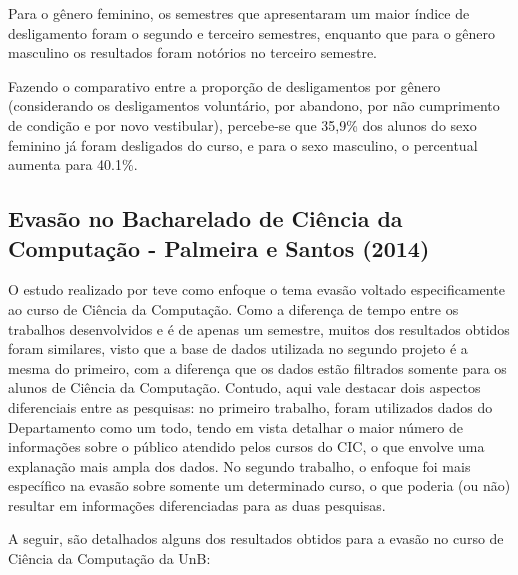 Para o gênero feminino, os semestres que apresentaram um maior índice de desligamento foram o segundo e terceiro semestres, enquanto que para o gênero masculino os resultados foram notórios no terceiro semestre.

Fazendo o comparativo entre a proporção de desligamentos por gênero (considerando os desligamentos voluntário, por abandono, por não cumprimento de condição e por novo vestibular), percebe-se que 35,9\% dos alunos do sexo feminino já foram desligados do curso, e para o sexo masculino, o percentual aumenta para 40.1\%.

\subsection{Evasão no Bacharelado de Ciência da Computação - Palmeira e Santos (2014)} \label{2title54}

O estudo realizado por \citet{palmeira_santos2014} teve como enfoque o tema evasão voltado especificamente ao curso de Ciência da Computação. Como a diferença de tempo entre os trabalhos desenvolvidos \cite{dantas2014} e \citet{palmeira_santos2014} é de apenas um semestre, muitos dos resultados obtidos foram similares, visto que a base de dados utilizada no segundo projeto é a mesma do primeiro, com a diferença que os dados estão filtrados somente para os alunos de Ciência da Computação. Contudo, aqui vale destacar dois aspectos diferenciais entre as pesquisas: no primeiro trabalho, foram utilizados dados do Departamento como um todo, tendo em vista detalhar o maior número de informações sobre o público atendido pelos cursos do CIC, o que envolve uma explanação mais ampla dos dados. No segundo trabalho, o enfoque foi mais específico na evasão sobre somente um determinado curso, o que poderia (ou não) resultar em informações diferenciadas para as duas pesquisas.

A seguir, são detalhados alguns dos resultados obtidos para a evasão no curso de Ciência da Computação da UnB:

